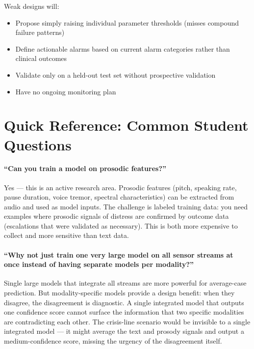 Weak designs will:
\begin{itemize}
    \item Propose simply raising individual parameter thresholds (misses compound failure patterns)
    \item Define actionable alarms based on current alarm categories rather than clinical outcomes
    \item Validate only on a held-out test set without prospective validation
    \item Have no ongoing monitoring plan
\end{itemize}

\section{Quick Reference: Common Student Questions}

\paragraph{``Can you train a model on prosodic features?''}
Yes --- this is an active research area. Prosodic features (pitch, speaking rate, pause duration, voice tremor, spectral characteristics) can be extracted from audio and used as model inputs. The challenge is labeled training data: you need examples where prosodic signals of distress are confirmed by outcome data (escalations that were validated as necessary). This is both more expensive to collect and more sensitive than text data.

\paragraph{``Why not just train one very large model on all sensor streams at once instead of having separate models per modality?''}
Single large models that integrate all streams are more powerful for average-case prediction. But modality-specific models provide a design benefit: when they disagree, the disagreement is diagnostic. A single integrated model that outputs one confidence score cannot surface the information that two specific modalities are contradicting each other. The crisis-line scenario would be invisible to a single integrated model --- it might average the text and prosody signals and output a medium-confidence score, missing the urgency of the disagreement itself.

